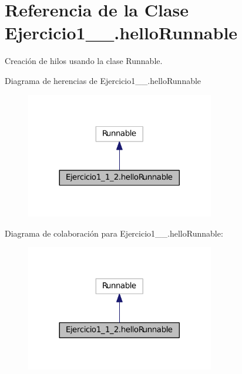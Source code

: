 \hypertarget{class_ejercicio1__1__2_1_1hello_runnable}{}\section{Referencia de la Clase Ejercicio1\+\_\+\_.\+hello\+Runnable}
\label{class_ejercicio1__1__2_1_1hello_runnable}


Creación de hilos usando la clase Runnable.  




Diagrama de herencias de Ejercicio1\+\_\+\_.\+hello\+Runnable
\nopagebreak
\begin{figure}[H]
\begin{center}
\leavevmode
\includegraphics[width=233pt]{class_ejercicio1__1__2_1_1hello_runnable__inherit__graph}
\end{center}
\end{figure}


Diagrama de colaboración para Ejercicio1\+\_\+\_.\+hello\+Runnable\+:
\nopagebreak
\begin{figure}[H]
\begin{center}
\leavevmode
\includegraphics[width=233pt]{class_ejercicio1__1__2_1_1hello_runnable__coll__graph}
\end{center}
\end{figure}

